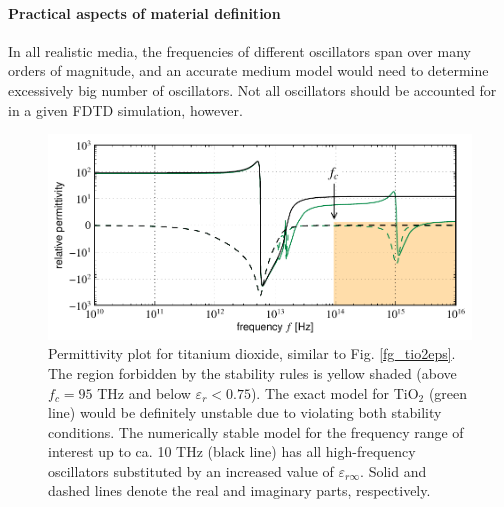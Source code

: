 \paragraph{Practical aspects of material definition} %
In all realistic media, the frequencies of different oscillators span over many orders of magnitude, and an accurate medium model would need to determine excessively big number of oscillators. Not all oscillators should be accounted for in a given FDTD simulation, however. 

\begin{figure}[t] \caption{Permittivity plot for titanium dioxide, similar to Fig. \ref{fg_tio2eps}. 
The region forbidden by the stability rules is yellow shaded (above $f_c = 95$ THz and below $\varepsilon_r < 0.75$). The exact model for TiO$_{2}$ (green line) would be definitely unstable due to violating both stability conditions. The numerically stable model for the frequency range of interest up to ca. 10 THz (black line) has all high-frequency oscillators substituted by an increased value of $\varepsilon_{r\infty}$. Solid and dashed lines denote the real and imaginary parts, respectively. } \label{fg_tio2eps_stripped} \centering 
	\includegraphics[width=14cm]{img/epsilon_TiO2stripped_symlog.pdf}
\end{figure}

